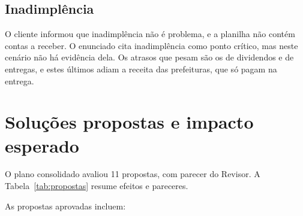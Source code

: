 \documentclass[12pt,a4paper,oneside,brazil]{abntex2}
\begin{document}
\subsection{Inadimplência}

O cliente informou que inadimplência não é problema, e a planilha não contém contas a receber. O enunciado cita inadimplência como ponto crítico, mas neste cenário não há evidência dela. Os atrasos que pesam são os de dividendos e de entregas, e estes últimos adiam a receita das prefeituras, que só pagam na entrega.

\section{Soluções propostas e impacto esperado}

O plano consolidado avaliou 11 propostas, com parecer do Revisor. A Tabela~\ref{tab:propostas} resume efeitos e pareceres.

\begin{table}[htb]
\caption{Propostas do sistema e parecer do Revisor}
\label{tab:propostas}
\centering\footnotesize
\resizebox{\textwidth}{!}{}
\end{table}

As propostas aprovadas incluem:
\end{document}
